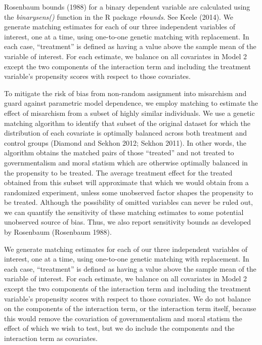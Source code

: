 \documentclass[12pt,]{article}
\begin{document}
Rosenbaum bounds (1988) for a binary dependent variable are calculated using the \emph{binarysens()} function in the R package \emph{rbounds}. See Keele (2014). We generate matching estimates for each of our three independent
variables of interest, one at a time, using one-to-one genetic matching
with replacement. In each case, ``treatment'' is defined as having a
value above the sample mean of the variable of interest. For each
estimate, we balance on all covariates in Model 2 except the two
components of the interaction term and including the treatment
variable's propensity scores with respect to those covariates.

To mitigate the risk of bias from non-random assignment into misarchism
and guard against parametric model dependence, we employ matching to
estimate the effect of misarchism from a subset of highly similar
individuals. We use a genetic matching algorithm to identify that subset
of the original dataset for which the distribution of each covariate is
optimally balanced across both treatment and control groups (Diamond and
Sekhon 2012; Sekhon 2011). In other words, the algorithm obtains the
matched pairs of those ``treated'' and not treated to governmentalism
and moral statism which are otherwise optimally balanced in the
propensity to be treated. The average treatment effect for the treated
obtained from this subset will approximate that which we would obtain
from a randomized experiment, unless some unobserved factor shapes the
propensity to be treated. Although the possibility of omitted variables
can never be ruled out, we can quantify the sensitivity of these
matching estimates to some potential unobserved source of bias. Thus, we
also report sensitivity bounds as developed by Rosenbaum (Rosenbaum
1988).

We generate matching estimates for each of our three independent
variables of interest, one at a time, using one-to-one genetic matching
with replacement. In each case, ``treatment'' is defined as having a
value above the sample mean of the variable of interest. For each
estimate, we balance on all covariates in Model 2 except the two
components of the interaction term and including the treatment
variable's propensity scores with respect to those covariates. We do not
balance on the components of the interaction term, or the interaction
term itself, because this would remove the covariation of
governmentalism and moral statism the effect of which we wish to test,
but we do include the components and the interaction term as covariates.
\end{document}
